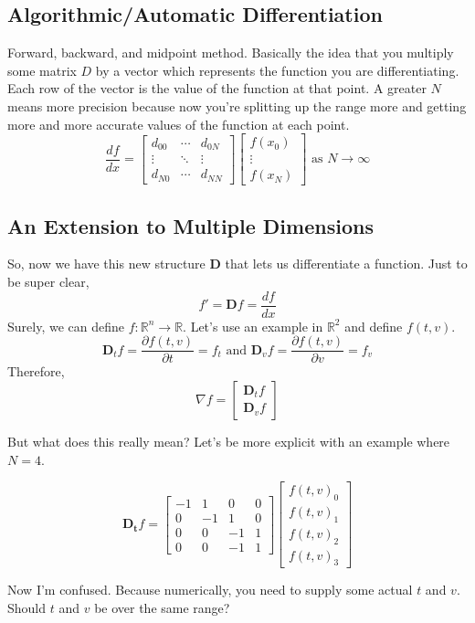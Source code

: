 \documentclass{article}
\begin{document}
\subsection {Algorithmic/Automatic Differentiation}
Forward, backward, and midpoint method.
Basically the idea that you multiply some matrix $D$ by a vector which represents the function you are differentiating. Each row of the vector is the
value of the function at that point. A greater $N$ means more precision because now you're splitting up the range more and getting more and more accurate
values of the function at each point. 
$$
\dfrac{df}{dx} = 
\begin{bmatrix}
	d_{00} & \cdots & d_{0N} \\
	\vdots & \ddots & \vdots \\
	d_{N0} & \cdots & d_{NN}
\end{bmatrix}
\begin{bmatrix}
	f(x_0) \\
	\vdots \\
	f(x_N)
\end{bmatrix}
\text{ as } N \rightarrow \infty
$$

\subsection {An Extension to Multiple Dimensions}
So, now we have this new structure $\mathbf{D}$ that lets us differentiate a function. Just to be super clear, $$f' = \mathbf{D}f = \dfrac{df}{dx}$$
Surely, we can define $f: \mathbb{R}^n \rightarrow \mathbb{R}$. Let's use an example in $\mathbb{R}^2$ and define $f(t, v)$.
$$\mathbf{D}_tf = \dfrac{\partial f(t, v)}{\partial t} = f_t \text{ and } \mathbf{D}_vf = \dfrac{\partial f(t, v)}{\partial v} = f_v$$
Therefore,
$$
\nabla f = \begin{bmatrix}
	\mathbf{D}_tf \\
	\mathbf{D}_vf
\end{bmatrix}
$$

But what does this really mean? Let's be more explicit with an example where $N = 4$.

$$
\mathbf{D_t}f = \begin{bmatrix}
	-1 &  1 &  0 & 0 \\
	 0 & -1 &  1 & 0 \\
	 0 &  0 & -1 & 1 \\
	 0 &  0 & -1 & 1
\end{bmatrix}
\begin{bmatrix}
	f(t, v)_0 \\
	f(t, v)_1 \\
	f(t, v)_2 \\
	f(t, v)_3
\end{bmatrix}
$$

Now I'm confused. Because numerically, you need to supply some actual $t$ and $v$. Should $t$ and $v$ be over the same range?
\end{document}
